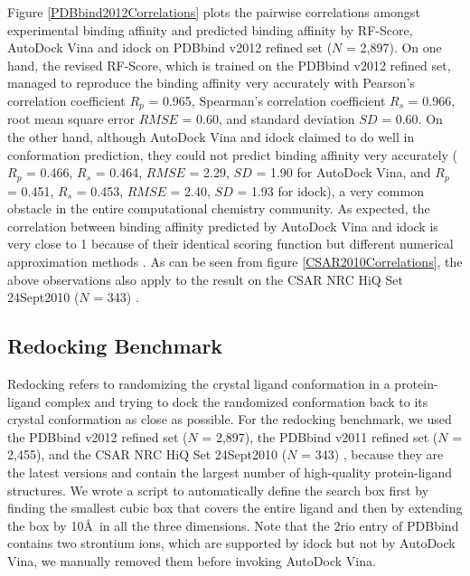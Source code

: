 \documentclass[10pt]{article}
\begin{document}
Figure \ref{PDBbind2012Correlations} plots the pairwise correlations amongst experimental binding affinity and predicted binding affinity by RF-Score, AutoDock Vina and idock on PDBbind v2012 \cite{529,530} refined set ($N$ = 2,897). On one hand, the revised RF-Score, which is trained on the PDBbind v2012 refined set, managed to reproduce the binding affinity very accurately with Pearson's correlation coefficient $R_p$ = 0.965, Spearman's correlation coefficient $R_s$ = 0.966, root mean square error $RMSE$ = 0.60, and standard deviation $SD$ = 0.60. On the other hand, although AutoDock Vina and idock claimed to do well in conformation prediction, they could not predict binding affinity very accurately ($R_p$ = 0.466, $R_s$ = 0.464, $RMSE$ = 2.29, $SD$ = 1.90 for AutoDock Vina, and $R_p$ = 0.451, $R_s$ = 0.453, $RMSE$ = 2.40, $SD$ = 1.93 for idock), a very common obstacle in the entire computational chemistry community. As expected, the correlation between binding affinity predicted by AutoDock Vina and idock is very close to 1 because of their identical scoring function but different numerical approximation methods \cite{1153}. As can be seen from figure \ref{CSAR2010Correlations}, the above observations also apply to the result on the CSAR NRC HiQ Set 24Sept2010 ($N$ = 343) \cite{857,960}.

\subsection*{Redocking Benchmark}
Redocking refers to randomizing the crystal ligand conformation in a protein-ligand complex and trying to dock the randomized conformation back to its crystal conformation as close as possible. For the redocking benchmark, we used the PDBbind v2012 \cite{529,530} refined set ($N$ = 2,897), the PDBbind v2011 refined set ($N$ = 2,455), and the CSAR NRC HiQ Set 24Sept2010 ($N$ = 343) \cite{857,960}, because they are the latest versions and contain the largest number of high-quality protein-ligand structures. We wrote a script to automatically define the search box first by finding the smallest cubic box that covers the entire ligand and then by extending the box by 10\AA\ in all the three dimensions. Note that the 2rio entry of PDBbind contains two strontium ions, which are supported by idock but not by AutoDock Vina, we manually removed them before invoking AutoDock Vina.
\end{document}
